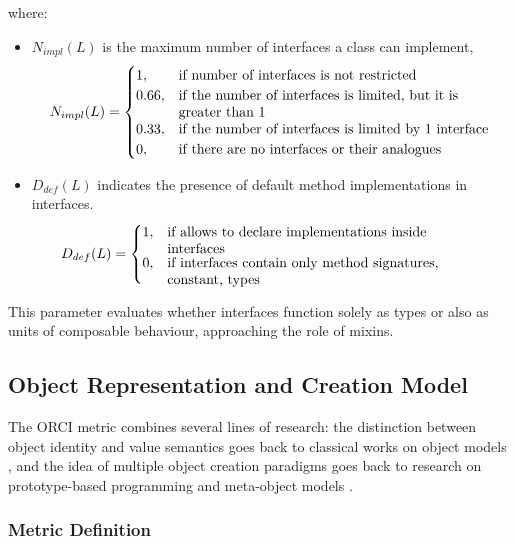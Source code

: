 where:
\begin{itemize}
    \item $N_{impl}(L)$ is the maximum number of interfaces a class can implement, 
    \[
    N_{impl}(L) = 
    \begin{cases}
        1, & \text{\parbox[t]{0.65\linewidth}{\raggedright
            if number of interfaces is not restricted%
         }} \\
        0.66, & \text{\parbox[t]{0.65\linewidth}{\raggedright
            if the number of interfaces is limited, but it is greater than 1%
         }} \\
        0.33, & \text{\parbox[t]{0.65\linewidth}{\raggedright
            if the number of interfaces is limited by 1 interface%
         }} \\
        0, & \text{\parbox[t]{0.65\linewidth}{\raggedright
            if there are no interfaces or their analogues%
         }}
    \end{cases}
    \]
    \item $D_{def}(L)$ indicates the presence of default method implementations in interfaces.
    \[
    D_{def}(L) = 
    \begin{cases}
    1, & \text{\parbox[t]{0.65\linewidth}{\raggedright
            if allows to declare implementations inside interfaces%
         }} \\
    0, & \text{\parbox[t]{0.65\linewidth}{\raggedright
            if interfaces contain only method signatures, constant, types%
         }}
    \end{cases}
    \]
\end{itemize}
This parameter evaluates whether interfaces function solely as types or also as units of composable behaviour, approaching the role of mixins.

\subsection{Object Representation and Creation Model}

The ORCI metric combines several lines of research: the distinction between object identity and value semantics goes back to classical works on object models \cite{meyer1997object}, and the idea of multiple object creation paradigms goes back to research on prototype-based programming and meta-object models \cite{kiczales1991art}.

\subsubsection{Metric Definition}

